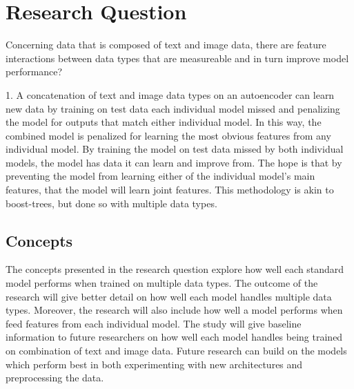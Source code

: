 \chapter{Research Question}


Concerning data that is composed of text and image data, there are feature interactions between data types that are measureable and in turn improve model performance?




1. A concatenation of text and image data types on an autoencoder can learn new data by training on test data each individual model missed and penalizing the model for outputs that match either individual model.  In this way, the combined model is penalized for learning the most obvious features from any individual model.  By training the model on test data missed by both individual models, the model has data it can learn and improve from.  The hope is that by preventing the model from learning either of the individual model's main features, that the model will learn joint features.  This methodology is akin to boost-trees, but done so with multiple data types.


\section{Concepts}
The concepts presented in the research question explore how well each standard model performs when trained on multiple data types.  The outcome of the research will give better detail on how well each model handles multiple data types.  Moreover, the research will also include how well a model performs when feed features from each individual model.  The study will give baseline information to future researchers on how well each model handles being trained on combination of text and image data.  Future research can build on the models which perform best in both experimenting with new architectures and preprocessing the data.




